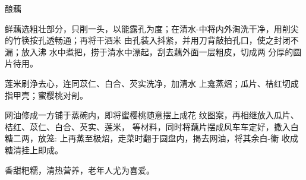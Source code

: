 \begin{recipe}[八宝酿藕]{酿藕}

\ingredients


\cooking

\step 鲜藕选粗壮部分，只削一头，以能露孔为度；在清水-中将内外淘洗干净，用削尖的竹筷按孔透畅通；再将干酒米 由孔装入抖紧，并用刀背敲拍孔口，使之封闭不漏；放入沸 水中煮把，捞于清水中漂起，刮去藕外面一层粗皮，切成两 分厚的圆片待用。

\step 莲米刷浄去心，连同苡仁、白合、芡实洗净，加清水 上龛蒸炤；瓜片、桔红切成指甲壳；蜜樱桃对剖。

\step 网油修成一方铺于蒸碗内，即将蜜樱桃随意摆上成花 纹图案，再相继放入瓜片、桔红、苡仁、白合、芡实、莲米， 等材料，同时将藕片摆成风车车定好，撒入白糖二两，放笼: 上再蒸至极炤，走菜时翻于圆盘内，揭去网油，将其余白-衞 收成糖清挂上即成。

\notes

香甜粑糯，清热营养，老年人尤为喜爱。

\end{recipe}

